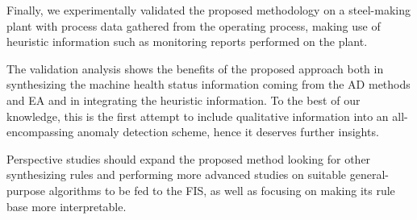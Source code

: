 Finally, we experimentally validated the proposed methodology on a steel-making plant with process data gathered from the operating process, making use of heuristic information such as monitoring reports performed on the plant. 

The validation analysis shows the benefits of the proposed approach both in synthesizing the machine health status information coming from the AD methods and EA and in integrating the heuristic information. 
To the best of our knowledge, this is the first attempt to include qualitative information into an all-encompassing anomaly detection scheme, hence it deserves further insights.  

Perspective studies should expand the proposed method looking for other synthesizing rules and performing more advanced studies on suitable general-purpose algorithms to be fed to the FIS, as well as focusing on making its rule base more interpretable.

